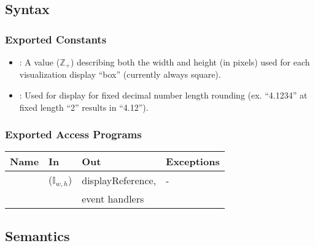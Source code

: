 \documentclass[12pt, titlepage]{article}
\begin{document}
\subsection{Syntax}

\subsubsection{Exported Constants}
\begin{itemize}
  \item {}: A value ($\mathbb{Z}_+$) describing both the width and height (in pixels)
    used for each visualization display ``box'' (currently always square).
  \item {}: Used for display for fixed decimal number length
    rounding (ex. ``4.1234'' at fixed length ``2'' results in ``4.12'').
\end{itemize}

\subsubsection{Exported Access Programs}

\begin{center}
\begin{tabular}{L{2cm} L{4cm} L{5cm} L{2cm}}
\hline
\textbf{Name} & \textbf{In} & \textbf{Out} & \textbf{Exceptions} \\
\hline
{} &  ($\mathbb{I}_{w,h}$) & displayReference, & - \\
           &                  & event handlers \\
\hline
\end{tabular}
\end{center}

\subsection{Semantics}
\end{document}
